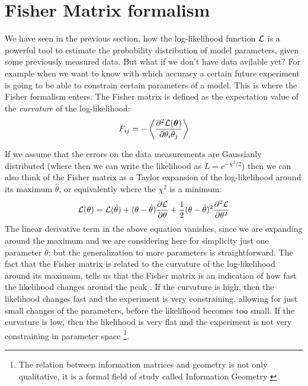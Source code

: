 \section{Fisher Matrix formalism}
We have seen in the previous section, how the log-likelihood function $\mathcal{L}$ is a powerful
tool to estimate the probability distribution of model parameters, given some previously measured data.
But what if we don't have data avilable yet? For example when we want to know 
with which accuracy a certain future experiment is going to be able to constrain certain parameters of
a model. 
This is where the Fisher formalism \cite{(cite Fisher, Tegmark, etc.)} enters.
The Fisher matrix is defined as the expectation value of the \emph{curvature} of the log-likelihood:
\begin{equation}\label{eq:Fishermatrix-definition}
F_{ij} = -\left< \frac{\partial^2 \mathcal{L}(\bm{\theta})}{\partial \theta_i \theta_j} \right>
\end{equation}

If we assume that the errors on the data measurements are Gaussianly distributed (where then we can write the likelihood as 
$L = e^{-\chi^2 / 2}$) then we can also think of the Fisher matrix as a Taylor expansion of the log-likelihood around its maximum
$\hat \theta$, or equivalently where the $\chi^2$ is a minimum:
\begin{equation}
\mathcal{L}(\theta) = \mathcal{L}(\hat \theta) + (\theta - \hat \theta)\frac{\partial{\mathcal{L}}}{\partial{\theta}} + 
\frac{1}{2}(\theta - \hat \theta)^2 \frac{\partial^2{\mathcal{L}}}{\partial{\theta}^2}
\end{equation}
The linear derivative term in the above equation vanishes, since we are expanding around the maximum and we are considering here 
for simplicity just one parameter $\theta$; but the generalization to more parameters is straightforward.
The fact that the Fisher matrix is related to the curvature of the log-likelihood around its maximum, tells us that the Fisher matrix 
is an indication of how fast the likelihood changes around the peak \cite{cite Dodelson...}. 
If the curvature is high, then the likelihood changes
fast and the experiment is very constraining, allowing for just small changes of the parameters, before the likelihood becomes too small.
If the curvature is low, then the likelihood is very flat and the experiment is not very constraining in parameter 
space \footnote{The relation between information matrices and geometry is not only qualitative, it is a 
formal field of study called Information Geometry \cite{cite Springer book}}.

